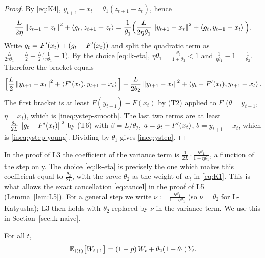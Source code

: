 \begin{proof}
By \eqref{eq:K4}, $y_{t+1}-x_t=\theta_1(z_{t+1}-z_t)$, hence
\begin{equation*}
\frac L{2\eta}\left\|z_{t+1}-z_t\right\|^2+\left\langle g_t, z_{t+1}-z_t \right\rangle=\frac1{\theta_1}\Big(\frac L{2\eta\theta_1}\left\|y_{t+1}-x_t\right\|^2+\left\langle g_t, y_{t+1}-x_t \right\rangle\Big).
\end{equation*}
Write $g_t=F'(x_t)+(g_t-F'(x_t))$ and split the quadratic term as $\frac L{2\eta\theta_1}=\frac L2+\frac L2\big(\frac1{\eta\theta_1}-1\big)$. By the choice \eqref{eq:lk-eta}, $\eta\theta_1=\frac{\theta_2}{1+\theta_2}<1$ and $\frac1{\eta\theta_1}-1=\frac1{\theta_2}$. Therefore the bracket equals
\begin{equation*}
\Big[\frac L2\left\|y_{t+1}-x_t\right\|^2+\left\langle F'(x_t), y_{t+1}-x_t \right\rangle\Big]+\frac L{2\theta_2}\left\|y_{t+1}-x_t\right\|^2+\left\langle g_t-F'(x_t), y_{t+1}-x_t \right\rangle.
\end{equation*}
The first bracket is at least $F(y_{t+1})-F(x_t)$ by (T2) applied to $F$ ($\theta=y_{t+1}$, $\eta=x_t$), which is \eqref{ineq:ystep-smooth}. The last two terms are at least $-\frac{\theta_2}{2L}\left\|g_t-F'(x_t)\right\|^2$ by (T6) with $\beta=L/\theta_2$, $a=g_t-F'(x_t)$, $b=y_{t+1}-x_t$, which is \eqref{ineq:ystep-young}. Dividing by $\theta_1$ gives \eqref{ineq:ystep}.
\end{proof}

\begin{remark}\label{rem:eta-theta2}
In the proof of L3 the coefficient of the variance term is $\frac1{2L}\cdot\frac{\eta\theta_1}{1-\eta\theta_1}$, a function of the step only. The choice \eqref{eq:lk-eta} is precisely the one which makes this coefficient equal to $\frac{\theta_2}{2L}$, with the \emph{same} $\theta_2$ as the weight of $w_t$ in \eqref{eq:K1}. This is what allows the exact cancellation \eqref{eq:cancel} in the proof of L5 (Lemma~\ref{lem:L5}). For a general step we write $\nu:=\frac{\eta\theta_1}{1-\eta\theta_1}$ (so $\nu=\theta_2$ for L-Katyusha); L3 then holds with $\theta_2$ replaced by $\nu$ in the variance term. We use this in Section~\ref{sec:lk-naive}.
\end{remark}

\begin{lemma}\label{lem:L4}
For all $t$,
\begin{equation}\label{eq:wstep}
\mathbb{E}_{i(t)}\big[W_{t+1}\big]=(1-p)\,W_t+\theta_2(1+\theta_1)\,Y_t .
\end{equation}
\end{lemma}

